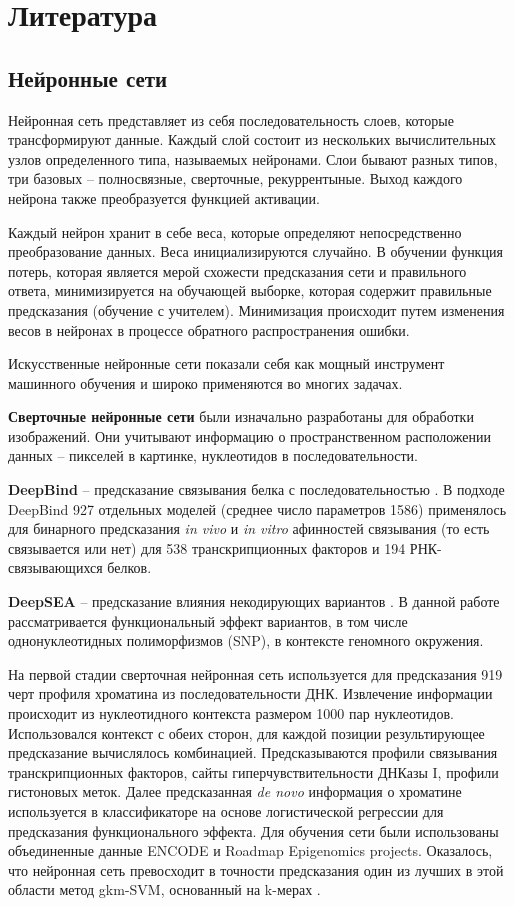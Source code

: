 \section{Литература}
\subsection{Нейронные сети}
Нейронная сеть представляет из себя последовательность слоев, которые трансформируют данные. Каждый слой состоит из нескольких вычислительных узлов определенного типа, называемых нейронами. Слои бывают разных типов, три базовых  -- полносвязные, сверточные, рекуррентыные. Выход каждого нейрона также преобразуется функцией активации.

Каждый нейрон хранит в себе веса, которые определяют непосредственно преобразование данных. Веса инициализируются случайно.
В обучении функция потерь, которая является мерой схожести предсказания сети и правильного ответа, минимизируется на обучающей выборке, которая содержит правильные предсказания (обучение с учителем). Минимизация происходит путем изменения весов в нейронах в процессе обратного распространения ошибки.

Искусственные нейронные сети показали себя как мощный инструмент машинного обучения и широко применяются во многих задачах.

{\bfseries Сверточные нейронные сети} были изначально разработаны для обработки изображений. Они учитывают информацию о пространственном расположении данных -- пикселей в картинке, нуклеотидов в последовательности.

{\bfseries DeepBind} -- предсказание связывания белка с последовательностью \cite{alipanahi_predicting_2015}.
В подходе DeepBind 927 отдельных моделей (среднее число параметров 1586) применялось для бинарного предсказания \emph{in vivo} и \emph{in vitro} афинностей связывания (то есть связывается или нет) для 538 транскрипционных факторов и 194 РНК-связывающихся белков.


{\bfseries DeepSEA} -- предсказание влияния некодирующих вариантов \cite{zhou_predicting_2015}.
 В данной работе рассматривается функциональный эффект вариантов, в том числе однонуклеотидных полиморфизмов (SNP), в контексте геномного окружения. 
 
На первой стадии сверточная нейронная сеть используется для предсказания 919 черт профиля хроматина из последовательности ДНК. Извлечение  информации происходит из нуклеотидного контекста размером 1000 пар нуклеотидов. Использовался контекст с обеих сторон, для каждой позиции результирующее предсказание вычислялось комбинацией. Предсказываются профили связывания транскрипционных факторов, сайты гиперчувствительности ДНКазы I, профили гистоновых меток. Далее предсказанная \emph{de novo} информация о хроматине используется в классификаторе на основе логистической регрессии для предсказания функционального эффекта.
Для обучения сети были использованы объединенные данные ENCODE и Roadmap Epigenomics projects. Оказалось, что нейронная сеть превосходит в точности предсказания один из лучших в этой области метод gkm-SVM, основанный на k-мерах \cite{ghandi_enhanced_2014}.

